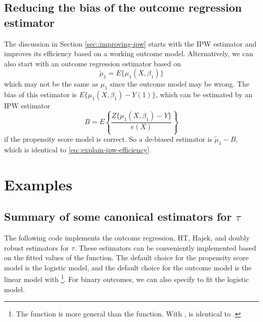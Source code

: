 \subsection{Reducing the bias of the outcome regression estimator}\label{sec::improving-outreg}


The discussion in Section \ref{sec::improving-ipw} starts with the IPW estimator and improves its efficiency based on a working outcome model. Alternatively, we can also start with an outcome regression estimator based on
$$
\tilde{\mu}_1 = E\{\mu_1(X, \beta_1)\} 
$$
which may not be the same as $\mu_1$ since the outcome model may be wrong. The bias of this estimator is $ E\{\mu_1(X, \beta_1)  -  Y(1)\}   $, which can be estimated by an IPW estimator
$$
B = 
E\left\{ \frac{Z \{\mu_1(X, \beta_1) - Y\}}{e(X)} \right\} 
$$
if the propensity score model is correct. So a de-biased estimator is
$
\tilde{\mu}_1 - B  ,
$
which is identical to \eqref{eq::explain-ipw-efficiency}. 


\section{Examples}
\label{sec::dr-examples}


\subsection{Summary of some canonical estimators for $\tau$}


The following  code implements the outcome regression, HT, Hajek, and doubly robust estimators for $\tau$. These estimators can be conveniently implemented based on the fitted values of the  function. The default choice for the propensity score model is the logistic model, and the default choice for the outcome model is the linear model with \footnote{The  function is more general than the  function. With ,  is identical to .}. For binary outcomes, we can also specify  to fit the logistic model.

